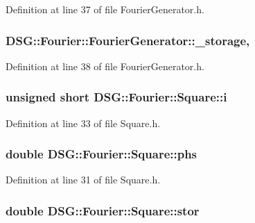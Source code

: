Definition at line 37 of file Fourier\-Generator.\-h.

\hypertarget{classDSG_1_1Fourier_1_1FourierGenerator_a43799227375e2d8b1354682e3a4fc935}{
\subsubsection[{\-\_\-storage}]{ D\-S\-G\-::\-Fourier\-::\-Fourier\-Generator\-::\-\_\-storage\hspace{0.3cm}{\ttfamily [protected]}, {\ttfamily [inherited]}}}\label{classDSG_1_1Fourier_1_1FourierGenerator_a43799227375e2d8b1354682e3a4fc935}


Definition at line 38 of file Fourier\-Generator.\-h.

\hypertarget{classDSG_1_1Fourier_1_1Square_a1fc677227d1631d4592bbbdfbe2358c8}{
\subsubsection[{i}]{\setlength{\rightskip}{0pt plus 5cm}unsigned short D\-S\-G\-::\-Fourier\-::\-Square\-::i\hspace{0.3cm}{\ttfamily [protected]}}}\label{classDSG_1_1Fourier_1_1Square_a1fc677227d1631d4592bbbdfbe2358c8}


Definition at line 33 of file Square.\-h.

\hypertarget{classDSG_1_1Fourier_1_1Square_afa3d8499a142c5b786c675dcd79704f4}{
\subsubsection[{phs}]{\setlength{\rightskip}{0pt plus 5cm}double D\-S\-G\-::\-Fourier\-::\-Square\-::phs\hspace{0.3cm}{\ttfamily [protected]}}}\label{classDSG_1_1Fourier_1_1Square_afa3d8499a142c5b786c675dcd79704f4}


Definition at line 31 of file Square.\-h.

\hypertarget{classDSG_1_1Fourier_1_1Square_a2ddf0aaac29e59a58e144baadd88a100}{
\subsubsection[{stor}]{\setlength{\rightskip}{0pt plus 5cm}double D\-S\-G\-::\-Fourier\-::\-Square\-::stor\hspace{0.3cm}{\ttfamily [protected]}}}\label{classDSG_1_1Fourier_1_1Square_a2ddf0aaac29e59a58e144baadd88a100}



